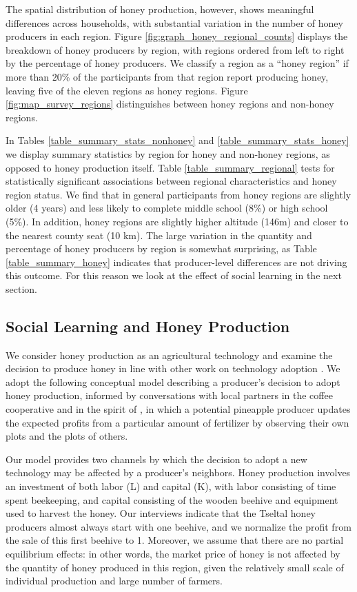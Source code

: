 \documentclass[../main.tex]{subfiles}
\begin{document}
The spatial distribution of honey production, however, shows meaningful differences across households, with substantial variation in the number of honey producers in each region. Figure 
\ref{fig:graph_honey_regional_counts} displays the breakdown
of honey producers by region, with regions ordered from left to right by the percentage of honey producers.  We classify a region as a ``honey region'' if more than 20\% of the participants from that region report producing honey, leaving five of the eleven regions as honey regions. Figure \ref{fig:map_survey_regions} distinguishes between honey regions and non-honey regions. 

In Tables \ref{table_summary_stats_nonhoney} 
and \ref{table_summary_stats_honey} 
we display summary statistics by region for honey and non-honey regions, as opposed to honey production itself. Table \ref{table_summary_regional} tests for statistically significant associations between regional characteristics and honey region status. We find that in general participants from
honey regions are slightly older (4 years) and less likely to complete middle school (8\%) or high school (5\%). In addition, honey regions are slightly higher altitude (146m) and closer to the nearest county seat (10 km). The large variation in the quantity
and percentage of honey producers by region is somewhat surprising, as  Table \ref{table_summary_honey} indicates that producer-level differences are not driving this outcome. For this reason we look at the effect of social learning in the next section. 

\subsection{Social Learning and Honey Production}
\label{social_learning}
We consider honey production as an agricultural technology and examine the decision to produce honey in line with other work on technology adoption \parencite{federAdoptionAgriculturalInnovations1985, fosterLearningDoingLearning1995, fosterMicroeconomicsTechnologyAdoption2010, conleyLearningNewTechnology2010}. 
 We  adopt the following conceptual model describing a producer's decision to adopt honey production, informed by conversations with  local partners in the coffee cooperative and in the spirit  of \textcite{conleyLearningNewTechnology2010}, in which
a potential pineapple producer updates the expected profits from a particular amount of fertilizer by observing their own plots and the plots of others. 

Our model provides two channels by which the decision to adopt a new technology may be affected by a producer's neighbors.
Honey production involves an investment of both labor (L) and capital (K), with labor consisting of time spent beekeeping,
and capital consisting of the wooden beehive and equipment used to harvest the honey. Our interviews indicate that the Tseltal honey producers almost always start with one beehive, and we 
normalize the profit from the sale of this first beehive to 1. Moreover, we assume that there are no partial equilibrium effects: in other words, the market price of honey is not affected by the quantity of honey produced in this region, given the relatively small scale of individual production and large number of farmers.
\end{document}
